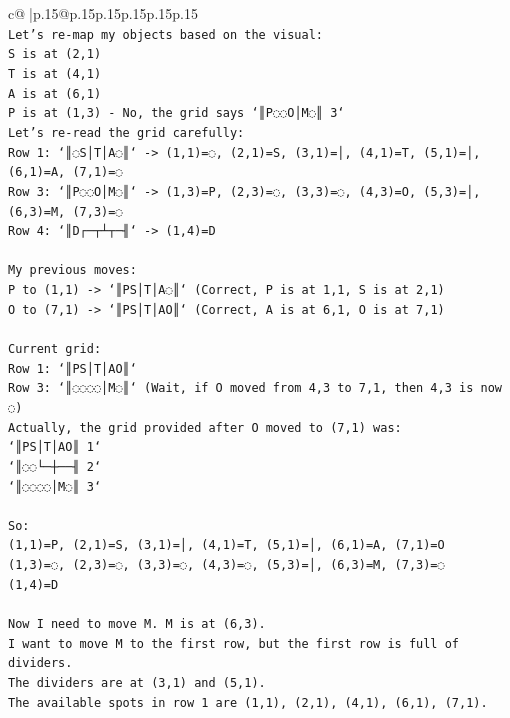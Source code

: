 \documentclass{article}
\begin{document}
{\begin{supertabular}{c@{$\;$}|p{.15\linewidth}@{}p{.15\linewidth}p{.15\linewidth}p{.15\linewidth}p{.15\linewidth}p{.15\linewidth}}
{{{\\ 
\texttt{Let's re{-}map my objects based on the visual:} \\
\texttt{S is at (2,1)} \\
\texttt{T is at (4,1)} \\
\texttt{A is at (6,1)} \\
\texttt{P is at (1,3) {-} No, the grid says `║P◌◌O│M◌║ 3`} \\
\texttt{Let's re{-}read the grid carefully:} \\
\texttt{Row 1: `║◌S│T│A◌║` {-}> (1,1)=◌, (2,1)=S, (3,1)=│, (4,1)=T, (5,1)=│, (6,1)=A, (7,1)=◌} \\
\texttt{Row 3: `║P◌◌O│M◌║` {-}> (1,3)=P, (2,3)=◌, (3,3)=◌, (4,3)=O, (5,3)=│, (6,3)=M, (7,3)=◌} \\
\texttt{Row 4: `║D┌─┬┴┬─╢` {-}> (1,4)=D} \\
\\ 
\texttt{My previous moves:} \\
\texttt{P to (1,1) {-}> `║PS│T│A◌║` (Correct, P is at 1,1, S is at 2,1)} \\
\texttt{O to (7,1) {-}> `║PS│T│AO║` (Correct, A is at 6,1, O is at 7,1)} \\
\\ 
\texttt{Current grid:} \\
\texttt{Row 1: `║PS│T│AO║`} \\
\texttt{Row 3: `║◌◌◌◌│M◌║` (Wait, if O moved from 4,3 to 7,1, then 4,3 is now ◌)} \\
\texttt{Actually, the grid provided after O moved to (7,1) was:} \\
\texttt{`║PS│T│AO║ 1`} \\
\texttt{`║◌◌└─┼──╢ 2`} \\
\texttt{`║◌◌◌◌│M◌║ 3`} \\
\\ 
\texttt{So:} \\
\texttt{(1,1)=P, (2,1)=S, (3,1)=│, (4,1)=T, (5,1)=│, (6,1)=A, (7,1)=O} \\
\texttt{(1,3)=◌, (2,3)=◌, (3,3)=◌, (4,3)=◌, (5,3)=│, (6,3)=M, (7,3)=◌} \\
\texttt{(1,4)=D} \\
\\ 
\texttt{Now I need to move M. M is at (6,3).} \\
\texttt{I want to move M to the first row, but the first row is full of dividers.} \\
\texttt{The dividers are at (3,1) and (5,1).} \\
\texttt{The available spots in row 1 are (1,1), (2,1), (4,1), (6,1), (7,1).} \\
}}}
\end{supertabular}}
\end{document}
